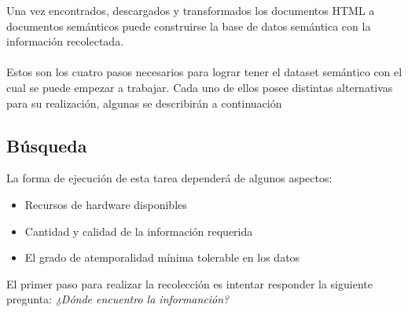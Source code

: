Una vez encontrados, descargados y transformados los documentos HTML a documentos semánticos puede construirse la base de datos semántica 
con la información recolectada. 
\\\\
Estos son los cuatro pasos necesarios para lograr tener el dataset semántico con el cual se puede empezar a trabajar. Cada uno de ellos 
posee distintas alternativas para su realización, algunas se describirán a continuación 



\subsection{Búsqueda}
%

\noindent La forma de ejecución de esta tarea dependerá de algunos aspectos:
\begin{itemize}
\item Recursos de hardware disponibles

\item Cantidad y calidad de la información requerida

\item El grado de atemporalidad mínima tolerable en los datos

\end{itemize}

El primer paso para realizar la recolección es intentar responder la siguiente pregunta: \textit{¿Dónde encuentro la informanción?}

